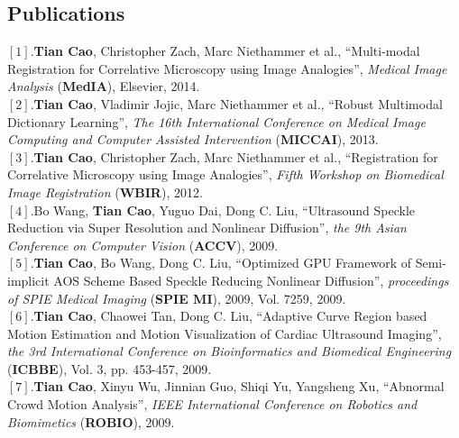\documentclass[line,margin]{res}
\begin{document}
\begin{resume}
\vspace{-.1in}


\section{\sc Publications}  
\smallskip
$[1]$.\textbf{Tian Cao}, Christopher Zach, Marc Niethammer et al., ``Multi-modal Registration for Correlative Microscopy using Image Analogies'', \emph{Medical Image Analysis} (\textbf{MedIA}), Elsevier, 2014. \vspace{.05in}\\
$[2]$.\textbf{Tian Cao}, Vladimir Jojic, Marc Niethammer et al., ``Robust Multimodal Dictionary Learning'', \emph{The 16th International Conference on Medical Image Computing and Computer Assisted Intervention} (\textbf{MICCAI}), 2013. \vspace{.05in}\\ 
$[3]$.\textbf{Tian Cao}, Christopher Zach, Marc Niethammer et al., ``Registration for Correlative Microscopy using Image Analogies'',  \emph{Fifth Workshop on Biomedical Image Registration} (\textbf{WBIR}), 2012. \vspace{.05in}\\%
$[4]$.Bo Wang, \textbf{Tian Cao}, Yuguo Dai, Dong C. Liu, ``Ultrasound Speckle Reduction via Super Resolution and Nonlinear Diffusion'',  \emph{the 9th Asian Conference on Computer Vision} (\textbf{ACCV}), 2009. \vspace{.05in}\\
$[5]$.\textbf{Tian Cao}, Bo Wang, Dong C. Liu, ``Optimized GPU Framework of Semi-implicit AOS
Scheme Based Speckle Reducing Nonlinear Diffusion'',  \emph{proceedings of SPIE Medical Imaging} (\textbf{SPIE MI}), 2009, Vol. 7259, 2009.\vspace{.05in}\\%
$[6]$.\textbf{Tian Cao}, Chaowei Tan, Dong C. Liu, ``Adaptive Curve Region based Motion Estimation and Motion Visualization of Cardiac Ultrasound Imaging'',  \emph{the 3rd International Conference on Bioinformatics and Biomedical Engineering} (\textbf{ICBBE}), Vol. 3, pp. 453-457, 2009.\vspace{.05in}\\
$[7]$.\textbf{Tian Cao}, Xinyu Wu, Jinnian Guo, Shiqi Yu, Yangsheng Xu, ``Abnormal Crowd Motion Analysis'', \emph{IEEE International Conference on Robotics and Biomimetics} (\textbf{ROBIO}), 2009.

%


\end{resume}
\end{document}
